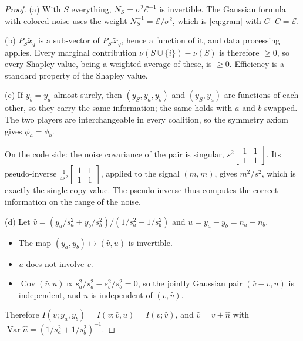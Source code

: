 \documentclass[11pt]{article}
\theoremstyle{definition}
\theoremstyle{remark}
\newcommand{\Var}{\operatorname{Var}}
\newcommand{\Cov}{\operatorname{Cov}}
\newcommand{\Em}{\mathcal{E}}         %
\begin{document}
\begin{proof}
(a) With $S$ everything, $N_S=\sigma^2\Em^{-1}$ is invertible. The Gaussian formula with
colored noise uses the weight $N_S^{-1}=\Em/\sigma^2$, which is \eqref{eq:gram} with
$C^\top C=\Em$.

(b) $P_S\tilde x_q$ is a sub-vector of $P_{S'}\tilde x_q$, hence a function of it, and
data processing applies. Every marginal contribution
$\nu(S\cup\{i\})-\nu(S)$ is therefore $\ge0$, so every Shapley value, being a weighted
average of these, is $\ge0$. Efficiency is a standard property of the Shapley value.

(c) If $y_b=y_a$ almost surely, then $(y_S,y_a,y_b)$ and $(y_S,y_a)$ are functions of
each other, so they carry the same information; the same holds with $a$ and $b$
swapped. The two players are interchangeable in every coalition, so the symmetry axiom
gives $\phi_a=\phi_b$.

On the code side: the noise covariance of the pair is singular, $s^2\left[\begin{smallmatrix}1&1\\1&1
\end{smallmatrix}\right]$. Its pseudo-inverse $\frac1{4s^2}\left[\begin{smallmatrix}1&1\\1&1\end{smallmatrix}
\right]$, applied to the signal $(m,m)$, gives $m^2/s^2$, which is exactly the
single-copy value. The pseudo-inverse thus computes the correct information on the range
of the noise.

(d) Let $\hat v=(y_a/s_a^2+y_b/s_b^2)/(1/s_a^2+1/s_b^2)$ and $u=y_a-y_b=n_a-n_b$.
\begin{itemize}[nosep]
  \item The map $(y_a,y_b)\mapsto(\hat v,u)$ is invertible.
  \item $u$ does not involve $v$.
  \item $\Cov(\hat v,u)\propto s_a^2/s_a^2-s_b^2/s_b^2=0$, so the jointly Gaussian pair
        $(\hat v-v,u)$ is independent, and $u$ is independent of $(v,\hat v)$.
\end{itemize}
Therefore $I(v;y_a,y_b)=I(v;\hat v,u)=I(v;\hat v)$, and
$\hat v=v+\hat n$ with $\Var\hat n=(1/s_a^2+1/s_b^2)^{-1}$.
\end{proof}
\end{document}
